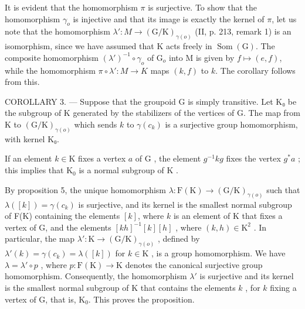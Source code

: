 It is evident that the homomorphism \(\pi\) is surjective. To show that the homomorphism \(\gamma_{o}\) is injective and that its image is exactly the kernel of \(\pi\), let us note that the homomorphism \(\lambda'\colon M \to (\mathrm{G}/\mathrm{K})_{\gamma(o)}\) (II, p. 213, remark 1) is an isomorphism, since we have assumed that K acts freely in \(\operatorname{Som}(\mathrm{G})\). The composite homomorphism \((\lambda')^{-1} \circ \gamma_{o}\) of \(\mathrm{G}_{o}\) into M is given by \(f \mapsto (e, f)\), while the homomorphism \(\pi \circ \lambda'\colon M \to K\) maps \((k, f)\) to \(k\). The corollary follows from this.

COROLLARY 3. --- Suppose that the groupoid G is simply transitive. Let K₀ be the subgroup of K generated by the stabilizers of the vertices of G. The map from K to \((\mathrm{G}/\mathrm{K})_{\gamma(o)}\) which sends \(k\) to \(\gamma(c_k)\) is a surjective group homomorphism, with kernel K₀.

If an element \(k \in \mathrm{K}\) fixes a vertex \(a\) of \(\mathrm{G}\) , the element \(g^{-1}kg\) fixes the vertex \(g^{*}a\) ; this implies that \(\mathrm{K}_{0}\) is a normal subgroup of \(\mathrm{K}\) .

By proposition 5, the unique homomorphism \(\lambda\colon\mathrm{F}(\mathrm{K})\to(\mathrm{G}/\mathrm{K})_{\gamma(o)}\) such that \(\lambda([k])=\gamma(c_k)\) is surjective, and its kernel is the smallest normal subgroup of F(K) containing the elements \([k]\), where \(k\) is an element of K that fixes a vertex of G, and the elements \([kh]^{-1}[k][h]\) , where \((k,h)\in\mathrm{K}^2\) . In particular, the map \(\lambda'\colon\mathrm{K}\to(\mathrm{G}/\mathrm{K})_{\gamma(o)}\) , defined by \(\lambda'(k)=\gamma(c_k)=\lambda([k])\) for \(k\in\mathrm{K}\) , is a group homomorphism. We have \(\lambda=\lambda'\circ p\) , where \(p\colon\mathrm{F}(\mathrm{K})\to\mathrm{K}\) denotes the canonical surjective group homomorphism. Consequently, the homomorphism \(\lambda'\) is surjective and its kernel is the smallest normal subgroup of K that contains the elements \(k\) , for \(k\) fixing a vertex of G, that is, \(\mathrm{K}_0\). This proves the proposition.
\relax{}
